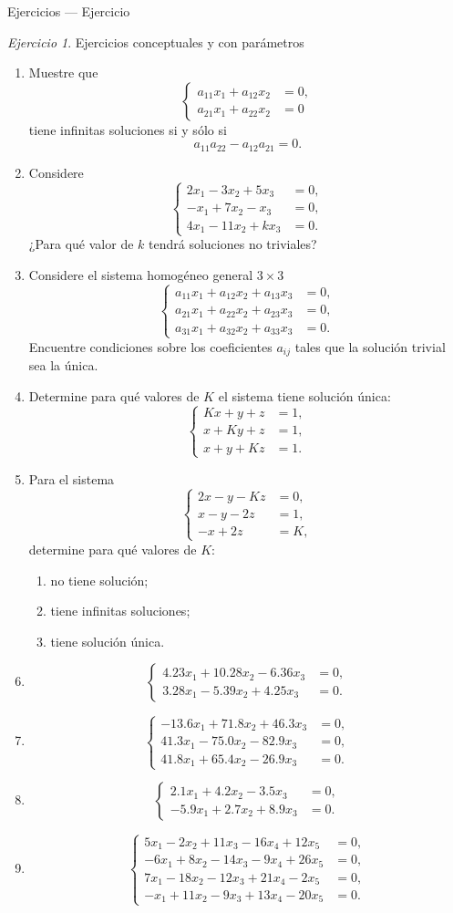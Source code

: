 \documentclass[aspectratio=169,11pt]{beamer}
\theoremstyle{remark}
\newtheorem{Ejer}[definicion]{Ejercicio}
\newcommand{\sistema}[1]{\[\left\{\begin{aligned}#1\end{aligned}\right.\]}
\begin{document}
\begin{frame}[shrink=5]{Ejercicios — Ejercicio}
\footnotesize
\begin{Ejer} Ejercicios conceptuales y con parámetros

\begin{enumerate}[resume]
\item Muestre que
\sistema{a_{11}x_1+a_{12}x_2&=0,\\a_{21}x_1+a_{22}x_2&=0}
tiene infinitas soluciones si y sólo si
\[
a_{11}a_{22}-a_{12}a_{21}=0.
\]

\item Considere
\sistema{
2x_1-3x_2+5x_3&=0,\\
-x_1+7x_2-x_3&=0,\\
4x_1-11x_2+kx_3&=0.
}
¿Para qué valor de $k$ tendrá soluciones no triviales?

\item Considere el sistema homogéneo general $3\times3$
\sistema{
a_{11}x_1+a_{12}x_2+a_{13}x_3&=0,\\
a_{21}x_1+a_{22}x_2+a_{23}x_3&=0,\\
a_{31}x_1+a_{32}x_2+a_{33}x_3&=0.
}
Encuentre condiciones sobre los coeficientes $a_{ij}$ tales que la solución trivial sea la única.

\item Determine para qué valores de $K$ el sistema tiene solución única:
\sistema{
Kx+y+z&=1,\\
x+Ky+z&=1,\\
x+y+Kz&=1.
}

\item Para el sistema
\sistema{
2x-y-Kz&=0,\\
x-y-2z&=1,\\
-x+2z&=K,
}
determine para qué valores de $K$:
\begin{enumerate}[label=\alph*)]
\item no tiene solución;
\item tiene infinitas soluciones;
\item tiene solución única.
\end{enumerate}

\item \sistema{
4.23x_1+10.28x_2-6.36x_3&=0,\\
3.28x_1-5.39x_2+4.25x_3&=0.
}

\item \sistema{
-13.6x_1+71.8x_2+46.3x_3&=0,\\
41.3x_1-75.0x_2-82.9x_3&=0,\\
41.8x_1+65.4x_2-26.9x_3&=0.
}

\item \sistema{
2.1x_1+4.2x_2-3.5x_3&=0,\\
-5.9x_1+2.7x_2+8.9x_3&=0.
}

\item \sistema{
5x_1-2x_2+11x_3-16x_4+12x_5&=0,\\
-6x_1+8x_2-14x_3-9x_4+26x_5&=0,\\
7x_1-18x_2-12x_3+21x_4-2x_5&=0,\\
-x_1+11x_2-9x_3+13x_4-20x_5&=0.
}
\end{enumerate}
\end{Ejer}
\end{frame}
\end{document}
